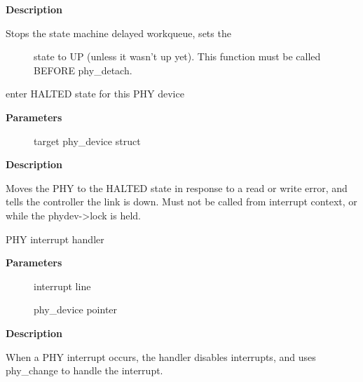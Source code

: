 \documentclass[a4paper,8pt,english]{sphinxmanual}
\begin{document}
\textbf{Description}
\begin{description}
\item[{Stops the state machine delayed workqueue, sets the}] \leavevmode
state to UP (unless it wasn't up yet). This function must be
called BEFORE phy\_detach.

\end{description}

\begin{fulllineitems}
\label{networking/kapi:c.phy_error}
enter HALTED state for this PHY device

\end{fulllineitems}


\textbf{Parameters}
\begin{description}
\item[{}] \leavevmode
target phy\_device struct

\end{description}

\textbf{Description}

Moves the PHY to the HALTED state in response to a read
or write error, and tells the controller the link is down.
Must not be called from interrupt context, or while the
phydev-\textgreater{}lock is held.

\begin{fulllineitems}
\label{networking/kapi:c.phy_interrupt}
PHY interrupt handler

\end{fulllineitems}


\textbf{Parameters}
\begin{description}
\item[{}] \leavevmode
interrupt line

\item[{}] \leavevmode
phy\_device pointer

\end{description}

\textbf{Description}

When a PHY interrupt occurs, the handler disables
interrupts, and uses phy\_change to handle the interrupt.
\end{document}
